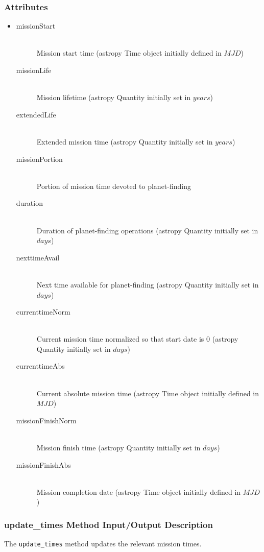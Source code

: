 \documentclass[cleanfoot]{asme2ej}
\begin{document}
\subsubsection*{Attributes}
\begin{itemize}
    \item
    \begin{description}
        \item[missionStart] \hfill \\
        Mission start time (astropy Time object initially defined in $ MJD $)
        \item[missionLife] \hfill \\
        Mission lifetime (astropy Quantity initially set in $ years $)
        \item[extendedLife] \hfill \\
        Extended mission time (astropy Quantity initially set in $ years $)
        \item[missionPortion] \hfill \\
        Portion of mission time devoted to planet-finding
        \item[duration] \hfill \\
        Duration of planet-finding operations (astropy Quantity initially set in $ days $)
        \item[nexttimeAvail] \hfill \\
        Next time available for planet-finding (astropy Quantity initially set in $ days $)
        \item[currenttimeNorm] \hfill \\
        Current mission time normalized so that start date is 0 (astropy Quantity initially set in $ days $)
        \item[currenttimeAbs] \label{sec:currenttime}\hfill \\
        Current absolute mission time (astropy Time object initially defined in $ MJD $)
        \item[missionFinishNorm] \hfill \\
        Mission finish time (astropy Quantity initially set in $ days $)
        \item[missionFinishAbs] \hfill \\
        Mission completion date (astropy Time object initially defined in $ MJD $)
    \end{description}
\end{itemize}

\subsubsection{update\_times Method Input/Output Description} \label{sec:updatetimestask}
The \verb+update_times+ method updates the relevant mission times.
\end{document}
